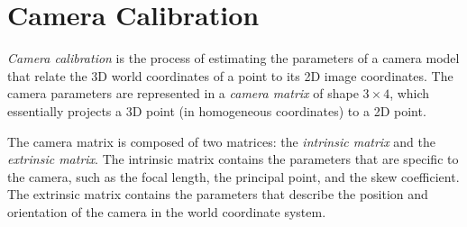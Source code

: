 \section{Camera Calibration}
\emph{Camera calibration} is the process of estimating the parameters of a camera model that relate the 3D world coordinates of a point to its 2D image coordinates. The camera parameters are represented in a \emph{camera matrix} of shape $3\times4$, which essentially projects a 3D point (in homogeneous coordinates) to a 2D point. 

The camera matrix is composed of two matrices: the \emph{intrinsic matrix} and the \emph{extrinsic matrix}. The intrinsic matrix contains the parameters that are specific to the camera, such as the focal length, the principal point, and the skew coefficient. The extrinsic matrix contains the parameters that describe the position and orientation of the camera in the world coordinate system.

